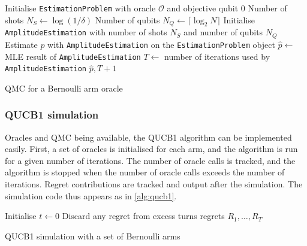 \begin{algorithm}
    \SetAlgoLined
    Initialise \texttt{EstimationProblem} with oracle $\mathcal{O}$ and objective qubit 0 \;
    Number of shots $N_S \leftarrow \log(1 / \delta)$ \;
    Number of qubits $N_Q \leftarrow \lceil \log_2 N \rceil$ \;
    Initialise \texttt{AmplitudeEstimation} with number of shots $N_S$ and number of qubits $N_Q$ \;
    Estimate $p$ with \texttt{AmplitudeEstimation} on the \texttt{EstimationProblem} object \;
    $\hat{p} \leftarrow$ MLE result of \texttt{AmplitudeEstimation} \;
    $T \leftarrow$ number of iterations used by \texttt{AmplitudeEstimation} \;
    \Return $\hat{p}, T + 1$
    \caption{QMC for a Bernoulli arm oracle}
    \label{alg:qucb_qmc}
\end{algorithm}

\subsubsection{QUCB1 simulation}
Oracles and QMC being available, the QUCB1 algorithm can be implemented easily.
First, a set of oracles is initialised for each arm, and the algorithm is run for a given number of iterations.
The number of oracle calls is tracked, and the algorithm is stopped when the number of oracle calls exceeds the number of iterations.
Regret contributions are tracked and output after the simulation.
The simulation code thus appears as in \cref{alg:qucb1}.

\begin{algorithm}
    \SetAlgoLined
    Initialise $t \leftarrow 0$ \;
    Discard any regret from excess turns \;
    \Return regrets $R_1, \ldots, R_T$
    \caption{QUCB1 simulation with a set of Bernoulli arms}
    \label{alg:qucb1_sim}
\end{algorithm}
